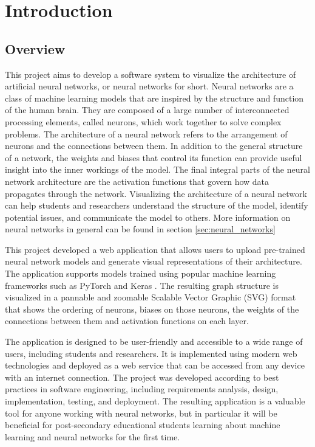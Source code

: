 \section{Introduction}
\label{sec:Introduction}

\subsection{Overview} 
This project aims to develop a software system to visualize the architecture of artificial neural networks, or neural networks for short. Neural networks are a class of machine learning models that are inspired by the structure and function of the human brain. They are composed of a large number of interconnected processing elements, called neurons, which work together to solve complex problems. The architecture of a neural network refers to the arrangement of neurons and the connections between them. In addition to the general structure of a network, the weights and biases that control its function can provide useful insight into the inner workings of the model. The final integral parts of the neural network architecture are the activation functions that govern how data propagates through the network. Visualizing the architecture of a neural network can help students and researchers understand the structure of the model, identify potential issues, and communicate the model to others. More information on neural networks in general can be found in section \ref{sec:neural_networks}


This project developed a web application that allows users to upload pre-trained neural network models and generate visual representations of their architecture. The application supports models trained using popular machine learning frameworks such as PyTorch \cite{pytorch} and Keras \cite{keras}. The resulting graph structure is visualized in a pannable and zoomable Scalable Vector Graphic (SVG) format that shows the ordering of neurons, biases on those neurons, the weights of the connections between them and activation functions on each layer.

The application is designed to be user-friendly and accessible to a wide range of users, including students and researchers. It is implemented using modern web technologies and deployed as a web service that can be accessed from any device with an internet connection. The project was developed according to best practices in software engineering, including requirements analysis, design, implementation, testing, and deployment. The resulting application is a valuable tool for anyone working with neural networks, but in particular it will be beneficial for post-secondary educational students learning about machine learning and neural networks for the first time.

